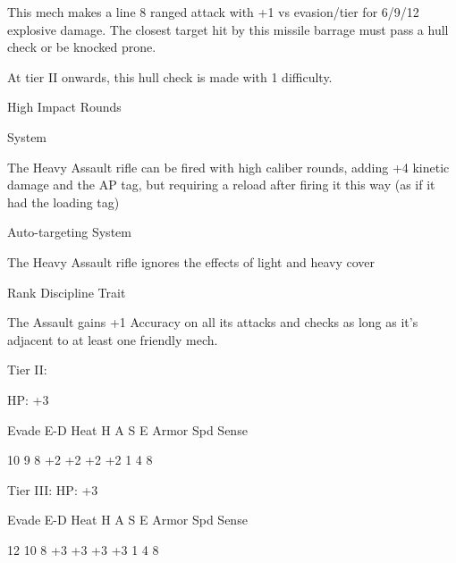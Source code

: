 This mech makes a line 8 ranged attack with +1 vs evasion/tier for 6/9/12 explosive damage. The
closest target hit by this missile barrage must pass a hull check or be knocked prone.

At tier II onwards, this hull check is made with 1 difficulty.


High Impact Rounds

System

The Heavy Assault rifle can be fired with high caliber rounds, adding +4 kinetic damage and the
AP tag, but requiring a reload after firing it this way (as if it had the loading tag)


Auto-targeting
System

The Heavy Assault rifle ignores the effects of light and heavy cover


Rank Discipline
Trait

The Assault gains +1 Accuracy on all its attacks and checks as long as it's adjacent to at least
one friendly mech.


Tier II:

HP: +3


          Evade    E-D    Heat     H    A     S     E       Armor        Spd      Sense

          10       9      8        +2   +2    +2    +2      1            4        8

Tier III:
HP: +3


          Evade    E-D    Heat     H    A     S     E       Armor        Spd      Sense

          12        10    8        +3   +3    +3    +3      1            4        8

